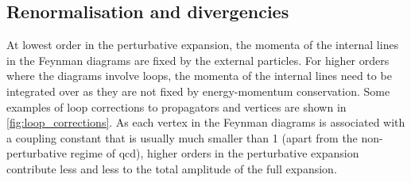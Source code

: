 \subsection{Renormalisation and divergencies}
\label{ch:renormalisation}

At lowest order in the perturbative expansion, the momenta of the internal lines in the Feynman diagrams are fixed by the external particles. For higher orders where the diagrams involve loops, the momenta of the internal lines need to be integrated over as they are not fixed by energy-momentum conservation. Some examples of loop corrections to propagators and vertices are shown in \cref{fig:loop_corrections}. As each vertex in the Feynman diagrams is associated with a coupling constant that is usually much smaller than 1 (apart from the non-perturbative regime of \gls{qcd}), higher orders in the perturbative expansion contribute less and less to the total amplitude of the full expansion.

